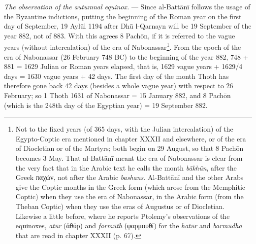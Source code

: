 \documentclass[11pt]{article}
\newcommand{\Pg}[1]{\marginpar{\footnotesize\color{gray}#1}}
\begin{document}
\par \Pg{I 210}\emph{The observation of the autumnal equinox.} — Since al-Battānī follows the usage of the Byzantine indictions, putting the beginning of the Roman year on the first day of September, 19 Aylūl 1194 after Dhū l-Qarnayn will be 19 September of the year 882, not of 883. With this agrees 8 Pachōn, if it is referred to the vague years (without intercalation) of the era of Nabonassar\footnote{Not to the fixed years (of 365 days, with the Julian intercalation) of the Egypto-Coptic era mentioned in chapter XXXII and elsewhere, or of the era of Diocletian or of the Martyrs; both begin on 29 August, so that 8 Pachōn becomes 3 May. That al-Battānī meant the era of Nabonassar is clear from the very fact that in the Arabic text he calls the month \emph{bākhūn}, after the Greek {\greekfont παχών}, not after the Arabic \emph{bashans}. Al-Battānī and the other Arabs give the Coptic months in the Greek form (which arose from the Memphitic Coptic) when they use the era of Nabonassar, in the Arabic form (from the Theban Coptic) when they use the eras of Augustus or of Diocletian. Likewise a little before, where he reports Ptolemy's observations of the equinoxes, \emph{atūr} ({\greekfont ἀθύρ}) and \emph{fārmūth} ({\greekfont φαρμουθί}) for the \emph{hatūr} and \emph{barmūdha} that are read in chapter XXXII (p. 67).}. From the epoch of the era of Nabonassar (26 February 748 BC) to the beginning of the year 882, 748 + 881 = 1629 Julian or Roman years elapsed, that is, 1629 vague years + 1629/4 days = 1630 vague years + 42 days. The first day of the month Thoth has therefore gone back 42 days (besides a whole vague year) with respect to 26 February; so 1 Thoth 1631 of Nabonassar = 15 January 882, and 8 Pachōn (which is the 248th day of the Egyptian year) = 19 September 882.\par
\end{document}
